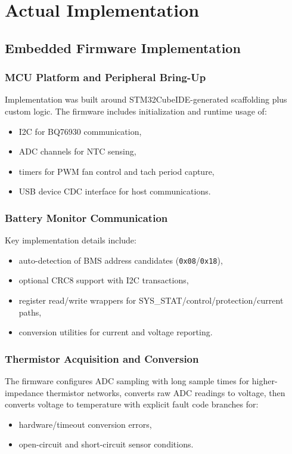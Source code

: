 \documentclass[12pt]{article}
\begin{document}
\section{Actual Implementation}

\subsection{Embedded Firmware Implementation}
\subsubsection{MCU Platform and Peripheral Bring-Up}
Implementation was built around STM32CubeIDE-generated scaffolding plus custom logic. The firmware includes initialization and runtime usage of:
\begin{itemize}[leftmargin=1.2cm]
    \item I2C for BQ76930 communication,
    \item ADC channels for NTC sensing,
    \item timers for PWM fan control and tach period capture,
    \item USB device CDC interface for host communications.
\end{itemize}

\subsubsection{Battery Monitor Communication}
Key implementation details include:
\begin{itemize}[leftmargin=1.2cm]
    \item auto-detection of BMS address candidates (\texttt{0x08}/\texttt{0x18}),
    \item optional CRC8 support with I2C transactions,
    \item register read/write wrappers for SYS\_STAT/control/protection/current paths,
    \item conversion utilities for current and voltage reporting.
\end{itemize}

\subsubsection{Thermistor Acquisition and Conversion}
The firmware configures ADC sampling with long sample times for higher-impedance thermistor networks, converts raw ADC readings to voltage, then converts voltage to temperature with explicit fault code branches for:
\begin{itemize}[leftmargin=1.2cm]
    \item hardware/timeout conversion errors,
    \item open-circuit and short-circuit sensor conditions.
\end{itemize}
\end{document}
